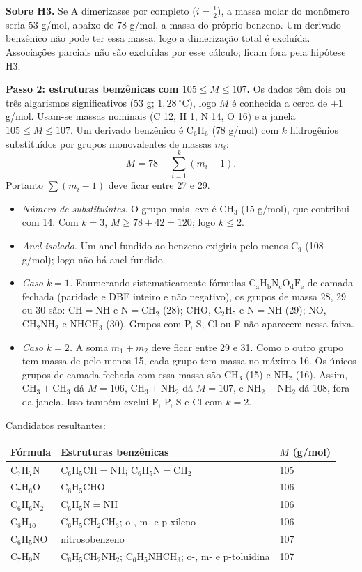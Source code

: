 \documentclass{article}%
\begin{document}
\textbf{Sobre H3.} Se A dimerizasse por completo ($i=\tfrac{1}{2}$), a massa molar do monômero seria $53$ g/mol, abaixo de $78$ g/mol, a massa do próprio benzeno. Um derivado benzênico não pode ter essa massa, logo a dimerização total é excluída. Associações parciais não são excluídas por esse cálculo; ficam fora pela hipótese H3.

\textbf{Passo 2: estruturas benzênicas com $105\leq M\leq 107$.} Os dados têm dois ou três algarismos significativos ($53$ g; $1{,}28\ ^\circ$C), logo $M$ é conhecida a cerca de $\pm 1$ g/mol. Usam-se massas nominais (C 12, H 1, N 14, O 16) e a janela $105\leq M\leq 107$. Um derivado benzênico é $\mathrm{C_6H_6}$ (78 g/mol) com $k$ hidrogênios substituídos por grupos monovalentes de massas $m_i$:
\[
M=78+\sum_{i=1}^{k}(m_i-1).
\]
Portanto $\sum(m_i-1)$ deve ficar entre 27 e 29.
\begin{itemize}
\item \textit{Número de substituintes.} O grupo mais leve é $\mathrm{CH_3}$ (15 g/mol), que contribui com 14. Com $k=3$, $M\geq 78+42=120$; logo $k\leq 2$.
\item \textit{Anel isolado.} Um anel fundido ao benzeno exigiria pelo menos $\mathrm{C_9}$ (108 g/mol); logo não há anel fundido.
\item \textit{Caso $k=1$.} Enumerando sistematicamente fórmulas $\mathrm{C_aH_bN_cO_dF_e}$ de camada fechada (paridade e DBE inteiro e não negativo), os grupos de massa 28, 29 ou 30 são: $\mathrm{CH{=}NH}$ e $\mathrm{N{=}CH_2}$ (28); $\mathrm{CHO}$, $\mathrm{C_2H_5}$ e $\mathrm{N{=}NH}$ (29); $\mathrm{NO}$, $\mathrm{CH_2NH_2}$ e $\mathrm{NHCH_3}$ (30). Grupos com P, S, Cl ou F não aparecem nessa faixa.
\item \textit{Caso $k=2$.} A soma $m_1+m_2$ deve ficar entre 29 e 31. Como o outro grupo tem massa de pelo menos 15, cada grupo tem massa no máximo 16. Os únicos grupos de camada fechada com essa massa são $\mathrm{CH_3}$ (15) e $\mathrm{NH_2}$ (16). Assim, $\mathrm{CH_3}+\mathrm{CH_3}$ dá $M=106$, $\mathrm{CH_3}+\mathrm{NH_2}$ dá $M=107$, e $\mathrm{NH_2}+\mathrm{NH_2}$ dá 108, fora da janela. Isso também exclui F, P, S e Cl com $k=2$.
\end{itemize}

Candidatos resultantes:
\begin{center}
\begin{tabular}{lll}
Fórmula & Estruturas benzênicas & $M$ (g/mol) \\
\hline
$\mathrm{C_7H_7N}$ & $\mathrm{C_6H_5CH{=}NH}$; $\mathrm{C_6H_5N{=}CH_2}$ & 105 \\
$\mathrm{C_7H_6O}$ & $\mathrm{C_6H_5CHO}$ & 106 \\
$\mathrm{C_6H_6N_2}$ & $\mathrm{C_6H_5N{=}NH}$ & 106 \\
$\mathrm{C_8H_{10}}$ & $\mathrm{C_6H_5CH_2CH_3}$; o-, m- e p-xileno & 106 \\
$\mathrm{C_6H_5NO}$ & nitrosobenzeno & 107 \\
$\mathrm{C_7H_9N}$ & $\mathrm{C_6H_5CH_2NH_2}$; $\mathrm{C_6H_5NHCH_3}$; o-, m- e p-toluidina & 107 \\
\end{tabular}
\end{center}
\end{document}
